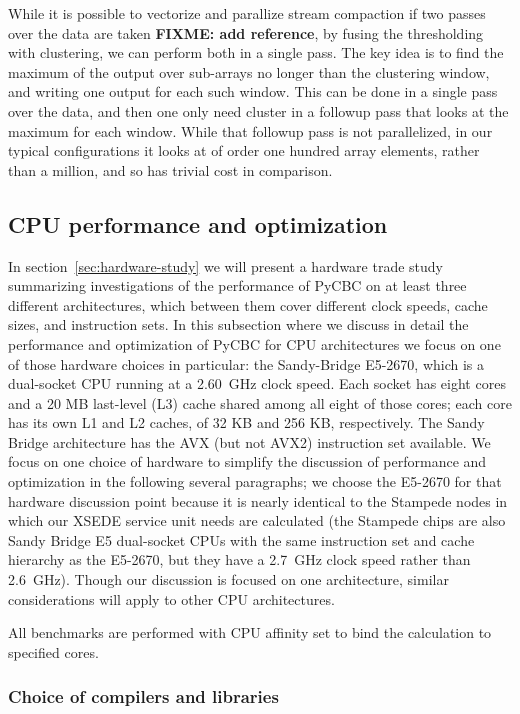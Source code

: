 \documentclass{article}
\begin{document}
While it is possible to vectorize and parallize stream compaction if two passes
over the data are taken \textbf{FIXME: add reference}, by fusing the
thresholding with clustering, we can perform both in a single pass. The key
idea is to find the maximum of the output over sub-arrays no longer than the
clustering window, and writing one output for each such window.  This can be
done in a single pass over the data, and then one only need cluster in a
followup pass that looks at the maximum for each window.  While that followup
pass is not parallelized, in our typical configurations it looks at of order one
hundred array elements, rather than a million, and so has trivial cost in
comparison.

\subsection{CPU performance and optimization}
\label{sec:cpu-perf-optim}

In section~\ref{sec:hardware-study} we will present a hardware trade study
summarizing investigations of the performance of PyCBC on at least three
different architectures, which between them cover different clock speeds, cache
sizes, and instruction sets.  In this subsection where we discuss in detail the
performance and optimization of PyCBC for CPU architectures we focus on one of
those hardware choices in particular: the Sandy-Bridge E5-2670, which is a
dual-socket CPU running at a 2.60~GHz clock speed.  Each socket has eight cores
and a 20 MB last-level (L3) cache shared among all eight of those cores; each
core has its own L1 and L2 caches, of 32 KB and 256 KB, respectively. The Sandy
Bridge architecture has the AVX (but not AVX2) instruction set available. We focus
on one choice of hardware to simplify the discussion of performance and 
optimization in the following several paragraphs; we choose the E5-2670 for that
hardware discussion point because it is nearly identical to the Stampede nodes
in which our XSEDE service unit needs are calculated (the Stampede chips are
also Sandy Bridge E5 dual-socket CPUs with the same instruction set and cache
hierarchy as the E5-2670, but they have a 2.7~GHz clock speed rather than
2.6~GHz). Though our discussion is focused on one architecture, similar
considerations will apply to other CPU architectures.

All benchmarks are performed with CPU affinity set to bind the calculation to
specified cores.

\subsubsection{Choice of compilers and libraries}
\label{sec:choice-comp-libr}
\end{document}
